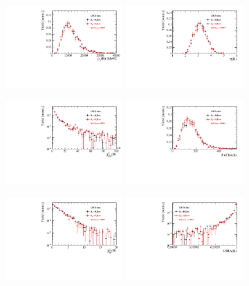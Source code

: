 \begin{figure}[h]
\centering
\includegraphics[height=!,width=0.4\textwidth]{figs/dataVsMC/B0vsBs_signal/Ds2all_Bs_PT.pdf}
\includegraphics[height=!,width=0.4\textwidth]{figs/dataVsMC/B0vsBs_signal/Ds2all_Bs_ETA.pdf}

\includegraphics[height=!,width=0.4\textwidth]{figs/dataVsMC/B0vsBs_signal/Ds2all_Bs_FDCHI2_OWNPV.pdf}
\includegraphics[height=!,width=0.4\textwidth]{figs/dataVsMC/B0vsBs_signal/Ds2all_NTracks.pdf}

\includegraphics[height=!,width=0.4\textwidth]{figs/dataVsMC/B0vsBs_signal/Ds2all_Bs_IPCHI2_OWNPV.pdf}
\includegraphics[height=!,width=0.4\textwidth]{figs/dataVsMC/B0vsBs_signal/Ds2all_Bs_DIRA_OWNPV.pdf}


\end{figure}
